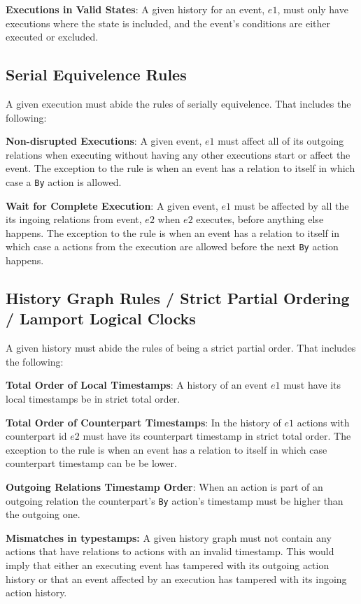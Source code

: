 	\newpar \textbf{Executions in Valid States}: A given history for an event, $e1$, must only have executions where the state is included, and the event's conditions are either executed or excluded.
	
	\subsection{Serial Equivelence Rules}
	A given execution must abide the rules of serially equivelence. That includes the following:
	
	\newpar \textbf{Non-disrupted Executions}: A given event, $e1$ must affect all of its outgoing relations when executing without having any other executions start or affect the event. The exception to the rule is when an event has a relation to itself in which case a \texttt{By} action is allowed.
	
	\newpar \textbf{Wait for Complete Execution}: A given event, $e1$ must be affected by all the its ingoing relations from event, $e2$ when $e2$ executes, before anything else happens. The exception to the rule is when an event has a relation to itself in which case a actions from the execution are allowed before the next \texttt{By} action happens. 
	
	\subsection{History Graph Rules / Strict Partial Ordering / Lamport Logical Clocks}
	A given history must abide the rules of being a strict partial order. That includes the following:
	
	\newpar \textbf{Total Order of Local Timestamps}: A history of an event $e1$ must have its local timestamps be in strict total order.
	
	\newpar \textbf{Total Order of Counterpart Timestamps}: In the history of $e1$ actions with counterpart id $e2$ must have its counterpart timestamp in strict total order.  The exception to the rule is when an event has a relation to itself in which case counterpart timestamp can be be lower. 
	
	\newpar \textbf{Outgoing Relations Timestamp Order}: When an action is part of an outgoing relation the counterpart's \texttt{By} action's timestamp must be higher than the outgoing one. 
	
	\newpar \textbf{Mismatches in typestamps:} A given history graph must not contain any actions that have relations to actions with an invalid timestamp. This would imply that either an executing event has tampered with its outgoing action history or that an event affected by an execution has tampered with its ingoing action history. 
	
